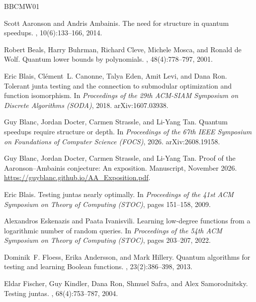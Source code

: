 \documentclass[11pt]{article}
\theoremstyle{remark}
\begin{document}
\begin{thebibliography}{BBCMW01}

Scott Aaronson and Andris Ambainis.
\newblock The need for structure in quantum speedups.
, 10(6):133--166, 2014.

Robert Beals, Harry Buhrman, Richard Cleve, Michele Mosca, and Ronald de Wolf.
\newblock Quantum lower bounds by polynomials.
, 48(4):778--797, 2001.

Eric Blais, Cl\'ement~L. Canonne, Talya Eden, Amit Levi, and Dana Ron.
\newblock Tolerant junta testing and the connection to submodular optimization and
  function isomorphism.
\newblock In {\em Proceedings of the 29th ACM-SIAM Symposium on Discrete Algorithms
  (SODA)}, 2018. arXiv:1607.03938.

Guy Blanc, Jordan Docter, Carmen Strassle, and Li-Yang Tan.
\newblock Quantum speedups require structure or depth.
\newblock In {\em Proceedings of the 67th IEEE Symposium on Foundations of Computer
  Science (FOCS)}, 2026. arXiv:2608.19158.

Guy Blanc, Jordan Docter, Carmen Strassle, and Li-Yang Tan.
\newblock Proof of the {Aaronson--Ambainis} conjecture: An exposition.
\newblock Manuscript, November 2026.
\newblock \url{https://guyblanc.github.io/AA_Exposition.pdf}.

Eric Blais.
\newblock Testing juntas nearly optimally.
\newblock In {\em Proceedings of the 41st ACM Symposium on Theory of Computing
  (STOC)}, pages 151--158, 2009.

Alexandros Eskenazis and Paata Ivanisvili.
\newblock Learning low-degree functions from a logarithmic number of random queries.
\newblock In {\em Proceedings of the 54th ACM Symposium on Theory of Computing
  (STOC)}, pages 203--207, 2022.

Dominik~F. Floess, Erika Andersson, and Mark Hillery.
\newblock Quantum algorithms for testing and learning {Boolean} functions.
, 23(2):386--398, 2013.

Eldar Fischer, Guy Kindler, Dana Ron, Shmuel Safra, and Alex Samorodnitsky.
\newblock Testing juntas.
, 68(4):753--787, 2004.


\end{thebibliography}
\end{document}
